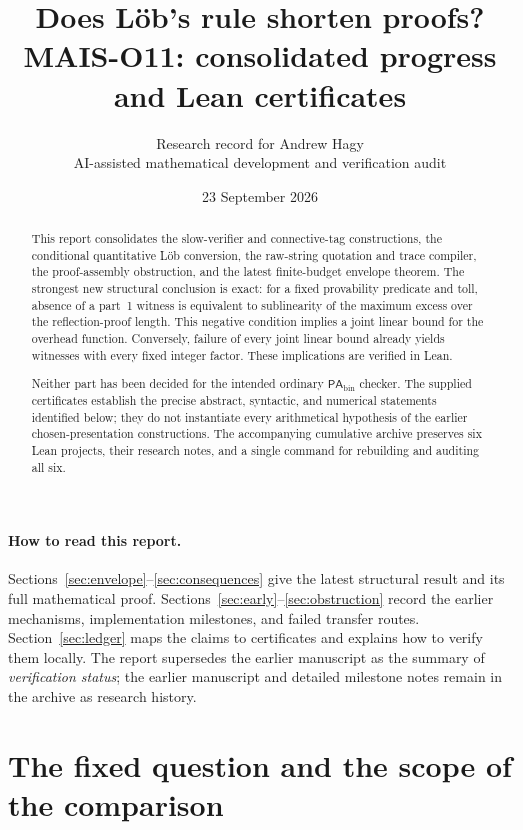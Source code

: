 \documentclass[11pt]{article}
\title{\textcolor{ink}{Does L\"ob's rule shorten proofs?}\\[5pt]
  \large MAIS-O11: consolidated progress and Lean certificates}
\author{Research record for Andrew Hagy\\
  \small AI-assisted mathematical development and verification audit}
\date{23 September 2026}
\theoremstyle{definition}
\theoremstyle{remark}
\newcommand{\PAbin}{\mathsf{PA}_{\mathrm{bin}}}
\begin{document}
\maketitle
\begin{abstract}
This report consolidates the slow-verifier and connective-tag constructions,
the conditional quantitative L\"ob conversion, the raw-string quotation and
trace compiler, the proof-assembly obstruction, and the latest finite-budget
envelope theorem. The strongest new structural conclusion is exact: for a
fixed provability predicate and toll, absence of a part~1 witness is equivalent
to sublinearity of the maximum excess over the reflection-proof length. This
negative condition implies a joint linear bound for the overhead function.
Conversely, failure of every joint linear bound already yields witnesses with
every fixed integer factor. These implications are verified in Lean.

Neither part has been decided for the intended ordinary $\PAbin$ checker.
The supplied certificates establish the precise abstract, syntactic, and
numerical statements identified below; they do not instantiate every
arithmetical hypothesis of the earlier chosen-presentation constructions.
The accompanying cumulative archive preserves six Lean projects, their
research notes, and a single command for rebuilding and auditing all six.
\end{abstract}

\paragraph{How to read this report.}
Sections~\ref{sec:envelope}--\ref{sec:consequences} give the latest structural
result and its full mathematical proof. Sections~\ref{sec:early}--\ref{sec:obstruction}
record the earlier mechanisms, implementation milestones, and failed transfer
routes. Section~\ref{sec:ledger} maps the claims to certificates and explains
how to verify them locally. The report supersedes the earlier manuscript as
the summary of \emph{verification status}; the earlier manuscript and detailed
milestone notes remain in the archive as research history.

\clearpage
{\small\tableofcontents}
\clearpage

\section{The fixed question and the scope of the comparison}
\label{sec:question}
\end{document}

